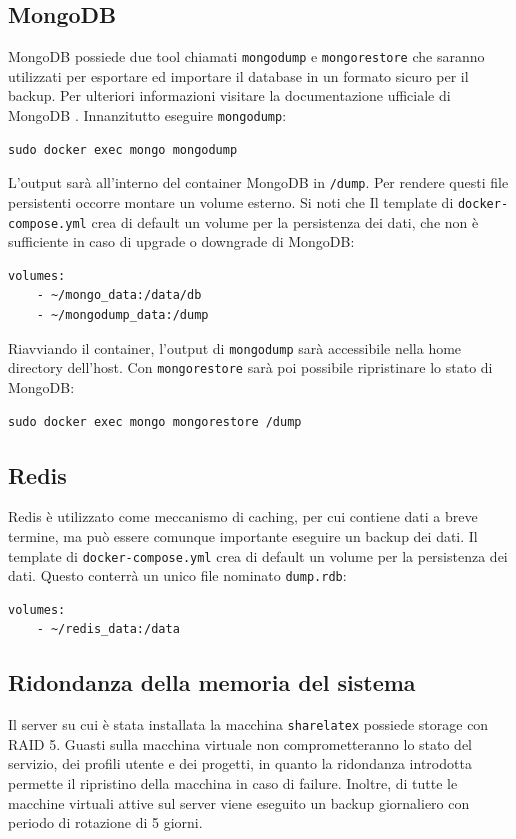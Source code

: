 \subsection{MongoDB}
MongoDB possiede due tool chiamati \verb|mongodump| e \verb|mongorestore| che saranno utilizzati per esportare ed importare il database in un formato sicuro per il backup. Per ulteriori informazioni visitare la documentazione ufficiale di MongoDB \cite{mongodb_dump_restore}. Innanzitutto eseguire \verb|mongodump|:
\begin{lstlisting}
sudo docker exec mongo mongodump
\end{lstlisting}
L'output sarà all'interno del container MongoDB in \verb|/dump|. Per rendere questi file persistenti occorre montare un volume esterno. Si noti che Il template di \verb|docker-compose.yml| crea di default un volume per la persistenza dei dati, che non è sufficiente in caso di upgrade o downgrade di MongoDB:
\begin{lstlisting}
volumes:
    - ~/mongo_data:/data/db
    - ~/mongodump_data:/dump
\end{lstlisting}
Riavviando il container, l'output di \verb|mongodump| sarà accessibile nella home directory dell'host. Con \verb|mongorestore| sarà poi possibile ripristinare lo stato di MongoDB:
\begin{lstlisting}
sudo docker exec mongo mongorestore /dump
\end{lstlisting}

\subsection{Redis}
Redis è utilizzato come meccanismo di caching, per cui contiene dati a breve termine, ma può essere comunque importante eseguire un backup dei dati. Il template di \verb|docker-compose.yml| crea di default un volume per la persistenza dei dati. Questo conterrà un unico file nominato \verb|dump.rdb|:
\begin{lstlisting}
volumes:
    - ~/redis_data:/data
\end{lstlisting} 

\subsection{Ridondanza della memoria del sistema}
Il server su cui è stata installata la macchina \verb|sharelatex| possiede storage con RAID 5. Guasti sulla macchina virtuale non comprometteranno lo stato del servizio, dei profili utente e dei progetti, in quanto la ridondanza introdotta permette il ripristino della macchina in caso di failure. Inoltre, di tutte le macchine virtuali attive sul server viene eseguito un backup giornaliero con periodo di rotazione di 5 giorni.

